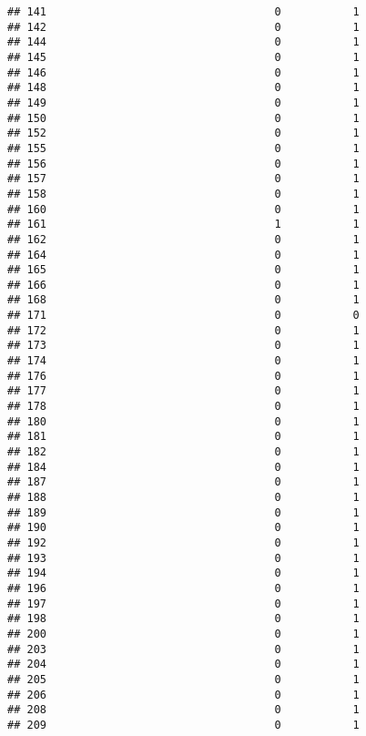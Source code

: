 \documentclass[
]{article}
\begin{document}
\begin{verbatim}
## 141                                   0           1
## 142                                   0           1
## 144                                   0           1
## 145                                   0           1
## 146                                   0           1
## 148                                   0           1
## 149                                   0           1
## 150                                   0           1
## 152                                   0           1
## 155                                   0           1
## 156                                   0           1
## 157                                   0           1
## 158                                   0           1
## 160                                   0           1
## 161                                   1           1
## 162                                   0           1
## 164                                   0           1
## 165                                   0           1
## 166                                   0           1
## 168                                   0           1
## 171                                   0           0
## 172                                   0           1
## 173                                   0           1
## 174                                   0           1
## 176                                   0           1
## 177                                   0           1
## 178                                   0           1
## 180                                   0           1
## 181                                   0           1
## 182                                   0           1
## 184                                   0           1
## 187                                   0           1
## 188                                   0           1
## 189                                   0           1
## 190                                   0           1
## 192                                   0           1
## 193                                   0           1
## 194                                   0           1
## 196                                   0           1
## 197                                   0           1
## 198                                   0           1
## 200                                   0           1
## 203                                   0           1
## 204                                   0           1
## 205                                   0           1
## 206                                   0           1
## 208                                   0           1
## 209                                   0           1

\end{verbatim}
\end{document}
